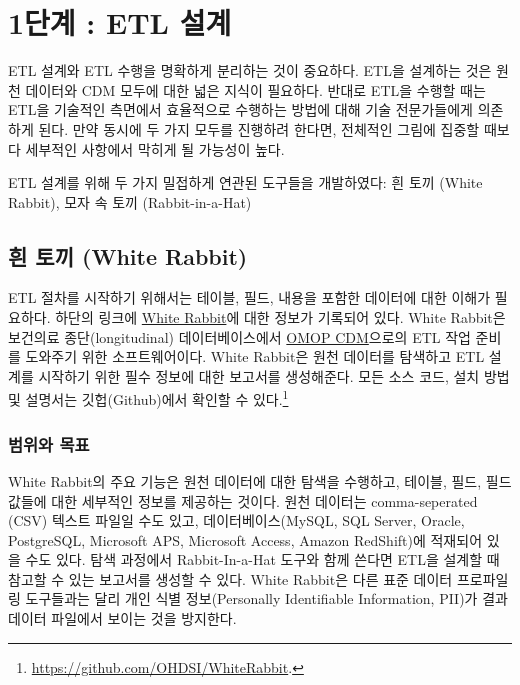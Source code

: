 \documentclass[11pt]{book}
\let\rmarkdownfootnote\footnote%
\def\footnote{\protect\rmarkdownfootnote}
\theoremstyle{definition}
\theoremstyle{definition}
\theoremstyle{definition}
\theoremstyle{remark}
\begin{document}
\section{1단계 : ETL 설계}\label{-etl-}

ETL 설계와 ETL 수행을 명확하게 분리하는 것이 중요하다. ETL을 설계하는
것은 원천 데이터와 CDM 모두에 대한 넓은 지식이 필요하다. 반대로 ETL을
수행할 때는 ETL을 기술적인 측면에서 효율적으로 수행하는 방법에 대해 기술
전문가들에게 의존하게 된다. 만약 동시에 두 가지 모두를 진행하려 한다면,
전체적인 그림에 집중할 때보다 세부적인 사항에서 막히게 될 가능성이 높다.

ETL 설계를 위해 두 가지 밀접하게 연관된 도구들을 개발하였다: 흰 토끼
(White Rabbit), 모자 속 토끼 (Rabbit-in-a-Hat)

\subsection{흰 토끼 (White Rabbit)}\label{--white-rabbit}

ETL 절차를 시작하기 위해서는 테이블, 필드, 내용을 포함한 데이터에 대한
이해가 필요하다. 하단의 링크에
\href{https://github.com/OHDSI/WhiteRabbit}{White Rabbit}에 대한 정보가
기록되어 있다. White Rabbit은 보건의료 종단(longitudinal)
데이터베이스에서 \href{https://github.com/OHDSI/CommonDataModel}{OMOP
CDM}으로의 ETL 작업 준비를 도와주기 위한 소프트웨어이다. White Rabbit은
원천 데이터를 탐색하고 ETL 설계를 시작하기 위한 필수 정보에 대한
보고서를 생성해준다. 모든 소스 코드, 설치 방법 및 설명서는
깃헙(Github)에서 확인할 수 있다.\footnote{\url{https://github.com/OHDSI/WhiteRabbit}.}
 

\subsubsection*{범위와 목표}\label{-}

White Rabbit의 주요 기능은 원천 데이터에 대한 탐색을 수행하고, 테이블,
필드, 필드 값들에 대한 세부적인 정보를 제공하는 것이다. 원천 데이터는
comma-seperated (CSV) 텍스트 파일일 수도 있고, 데이터베이스(MySQL, SQL
Server, Oracle, PostgreSQL, Microsoft APS, Microsoft Access, Amazon
RedShift)에 적재되어 있을 수도 있다. 탐색 과정에서 Rabbit-In-a-Hat
도구와 함께 쓴다면 ETL을 설계할 때 참고할 수 있는 보고서를 생성할 수
있다. White Rabbit은 다른 표준 데이터 프로파일링 도구들과는 달리 개인
식별 정보(Personally Identifiable Information, PII)가 결과 데이터
파일에서 보이는 것을 방지한다.
\end{document}

